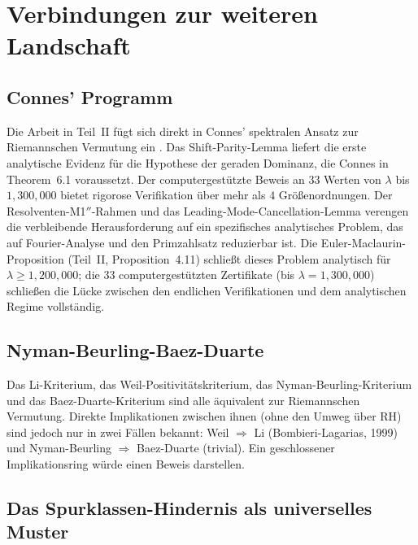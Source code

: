 \documentclass[12pt,a4paper]{article}
\theoremstyle{definition}
\theoremstyle{remark}
\begin{document}
\section{Verbindungen zur weiteren Landschaft}
\label{sec:connections}

\subsection{Connes' Programm}

Die Arbeit in Teil~II fügt sich direkt in Connes' spektralen Ansatz zur Riemannschen Vermutung ein \cite{Connes2025}. Das Shift-Parity-Lemma liefert die erste analytische Evidenz für die Hypothese der geraden Dominanz, die Connes in Theorem~6.1 voraussetzt. Der computergestützte Beweis an $33$ Werten von $\lambda$ bis $1{,}300{,}000$ bietet rigorose Verifikation über mehr als $4$ Größenordnungen. Der Resolventen-M1$''$-Rahmen und das Leading-Mode-Cancellation-Lemma verengen die verbleibende Herausforderung auf ein spezifisches analytisches Problem, das auf Fourier-Analyse und den Primzahlsatz reduzierbar ist. Die Euler-Maclaurin-Proposition (Teil~II, Proposition~4.11) schließt dieses Problem analytisch für $\lambda \geq 1{,}200{,}000$; die $33$ computergestützten Zertifikate (bis $\lambda = 1{,}300{,}000$) schließen die Lücke zwischen den endlichen Verifikationen und dem analytischen Regime vollständig.

\subsection{Nyman-Beurling-Baez-Duarte}

Das Li-Kriterium, das Weil-Positivitätskriterium, das Nyman-Beurling-Kriterium und das Baez-Duarte-Kriterium sind alle äquivalent zur Riemannschen Vermutung. Direkte Implikationen zwischen ihnen (ohne den Umweg über RH) sind jedoch nur in zwei Fällen bekannt: Weil $\Rightarrow$ Li (Bombieri-Lagarias, 1999) und Nyman-Beurling $\Rightarrow$ Baez-Duarte (trivial). Ein geschlossener Implikationsring würde einen Beweis darstellen.

\subsection{Das Spurklassen-Hindernis als universelles Muster}
\end{document}
